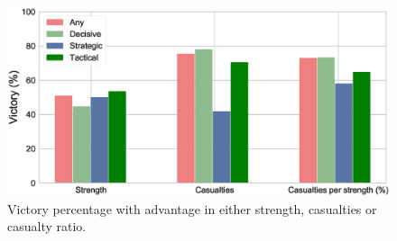  \begin{figure}[h]
	\centering	\includegraphics[width=\linewidth]{figures/VictoryAdvantage}
	\caption{Victory percentage with advantage in either strength, casualties or casualty ratio.}\label{fig:victoryAdvantage}
	\centering
\end{figure}

